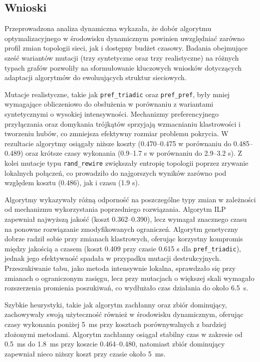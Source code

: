\subsection{Wnioski}
Przeprowadzona analiza dynamiczna wykazała, że dobór algorytmu optymalizacyjnego w środowisku dynamicznym powinien uwzględniać zarówno profil zmian topologii sieci, jak i dostępny budżet czasowy. Badania obejmujące sześć wariantów mutacji (trzy syntetyczne oraz trzy realistyczne) na różnych typach grafów pozwoliły na sformułowanie kluczowych wniosków dotyczących adaptacji algorytmów do ewoluujących struktur sieciowych.

Mutacje realistyczne, takie jak \texttt{pref\_triadic} oraz \texttt{pref\_pref}, były mniej wymagające obliczeniowo do obsłużenia w porównaniu z wariantami syntetycznymi o wysokiej intensywności. Mechanizmy preferencyjnego przyłączania oraz domykania trójkątów sprzyjają wzmacnianiu klastrowości i tworzeniu hubów, co zmniejsza efektywny rozmiar problemu pokrycia. W rezultacie algorytmy osiągały niższe koszty (0.470--0.475 w porównaniu do 0.485--0.489) oraz krótsze czasy wykonania (0.9--1.7 s w porównaniu do 2.9--3.2 s). Z kolei mutacje typu \texttt{rand\_rewire} zwiększały entropię topologii poprzez zrywanie lokalnych połączeń, co prowadziło do najgorszych wyników zarówno pod względem kosztu (0.486), jak i czasu (1.9 s).

Algorytmy wykazywały różną odporność na poszczególne typy zmian w zależności od mechanizmu wykorzystania poprzedniego rozwiązania. Algorytm ILP zapewniał najwyższą jakość (koszt 0.362--0.390), lecz wymagał znacznego czasu na ponowne rozwiązanie zmodyfikowanych ograniczeń. Algorytm genetyczny dobrze radził sobie przy zmianach klastrowych, oferując korzystny kompromis między jakością a czasem (koszt 0.409 przy czasie 0.615 s dla \texttt{pref\_triadic}), jednak jego efektywność spadała w przypadku mutacji destrukcyjnych. Przeszukiwanie tabu, jako metoda intensywnie lokalna, sprawdzało się przy zmianach o ograniczonym zasięgu, lecz przy mutacjach o większej skali wymagało rozszerzenia promienia poszukiwań, co wydłużało czas działania do około \SI{6.5}{\second}.

Szybkie heurystyki, takie jak algorytm zachłanny oraz zbiór dominujący, zachowywały swoją użyteczność również w środowisku dynamicznym, oferując czasy wykonania poniżej \SI{5}{\milli\second} przy kosztach porównywalnych z bardziej złożonymi metodami. Algorytm zachłanny osiągał stabilny czas w zakresie od \SI{0.5}{\milli\second} do \SI{1.8}{\milli\second} przy koszcie 0.464--0.480, natomiast zbiór dominujący zapewniał nieco niższy koszt przy czasie około \SI{5}{\milli\second}.

